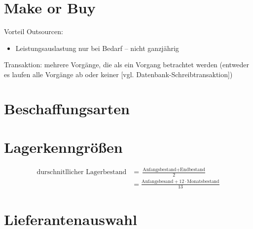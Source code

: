 \section{Make or Buy}
Vorteil Outsourcen:
\begin{itemize}
\item Leistungsauslastung nur bei Bedarf -- nicht ganzjährig
\end{itemize}
Transaktion: mehrere Vorgänge, die als ein Vorgang betrachtet werden (entweder es laufen alle Vorgänge ab oder keiner [vgl. Datenbank-Schreibtransaktion])
\section{Beschaffungsarten}
\section{Lagerkenngrößen}
\begin{align*}
\text{durschnitllicher Lagerbestand} &=\frac{\text{Anfangsbestand}+\text{Endbestand}}{2}\\
&= \frac{\text{Anfangsbesand}+12 \cdot \text{Monatsbestand}}{13}
\end{align*}
\section{Lieferantenauswahl}









